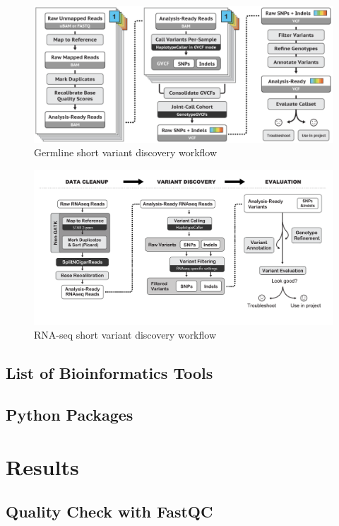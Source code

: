 \documentclass[a4paper]{article}
\begin{document}
            \begin{figure}[p]
                \centering
                \includegraphics[width=0.8 \linewidth]{figures/Workflow/germline_short_variant.png}
                \caption{Germline short variant discovery workflow \protect\cite{gatk1, gatk2}}
                \label{fig:workflow-germline}
            \end{figure}

            \begin{figure}[p]
                \centering
                \includegraphics[width=0.8 \linewidth]{figures/Workflow/RNA_short_variant.png}
                \caption{RNA-seq short variant discovery workflow \protect\cite{gatk1, gatk2}}
                \label{fig:workflow-RNA}
            \end{figure}

        \subsection{List of Bioinformatics Tools}

        \subsection{Python Packages}

    \section{Results}
        \subsection{Quality Check with FastQC}
\end{document}
